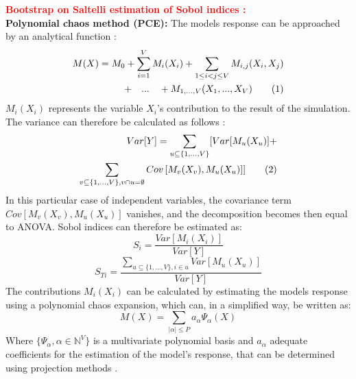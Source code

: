 \textcolor{red}{\textbf{Bootstrap on Saltelli estimation of Sobol indices :} } \\

\textbf{Polynomial chaos method (PCE):} The models response can be approached by an analytical function :
\begin{align*}
M(X) = M_{0} + \sum_{i=1}^V M_i(X_i) + \sum_{1 \leq i < j \leq V} M_{i,j}(X_i,X_j) \\ 
+  \quad ... \quad + M_{1,...,V}(X_1,...,X_V) \addtocounter{equation}{1}\tag{\theequation}
\end{align*} 
$M_i(X_i)$ represents the variable $X_i$'s contribution to the result of the simulation. The variance can therefore be calculated as follows \cite{bib4}:
\begin{align*}
Var[Y] = \sum_{u \subseteq \{1,...,V\}} [ Var[M_u(X_u)] + \\
\sum_{v \subseteq \{1,...,V\}, v \cap u = \emptyset} Cov\left[M_v(X_v), M_u(X_u)\right]] \addtocounter{equation}{1}\tag{\theequation}
\end{align*}
In this particular case of independent variables, the covariance term $Cov\left[M_v(X_v), M_u(X_u)\right]$ vanishes, and the decomposition becomes then equal to ANOVA. Sobol indices can therefore be estimated as:
\begin{equation}
S_i = \dfrac{Var\left[M_i(X_i)\right]}{Var[Y]}
\end{equation}
\begin{equation}
S_{Ti} = \dfrac{\sum_{u \subseteq\{1,...,V\}, i \in u} Var\left[M_u(X_u)\right]}{Var[Y]}
\end{equation}
The contributions $M_i(X_i)$ can be calculated by estimating the models response using a polynomial chaos expansion, which can, in a simplified way, be written as:
\begin{equation}
M(X) = \sum_{|\alpha | \leq P} a_\alpha \Psi_\alpha (X)
\end{equation}
Where  $\{ \Psi_\alpha,\alpha \in \mathbb{N}^V \}$ is a multivariate polynomial basis and $a_\alpha$ adequate coefficients for the estimation of the model's response, that can be determined using projection methods \cite{bib4}.

